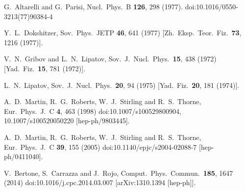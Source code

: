 \documentclass[review]{elsarticle}
\begin{document}
\begin{thebibliography}{}
  G.~Altarelli and G.~Parisi,
  Nucl.\ Phys.\ B {\bf 126}, 298 (1977).
  doi:10.1016/0550-3213(77)90384-4
  
    Y.~L.~Dokshitzer,
    Sov.\ Phys.\ JETP {\bf 46}, 641 (1977)
    [Zh.\ Eksp.\ Teor.\ Fiz.\  {\bf 73}, 1216 (1977)].
    
  V.~N.~Gribov and L.~N.~Lipatov,
  Sov.\ J.\ Nucl.\ Phys.\  {\bf 15}, 438 (1972)
  [Yad.\ Fiz.\  {\bf 15}, 781 (1972)].
  
  L.~N.~Lipatov,
  Sov.\ J.\ Nucl.\ Phys.\  {\bf 20}, 94 (1975)
  [Yad.\ Fiz.\  {\bf 20}, 181 (1974)].
  
  A.~D.~Martin, R.~G.~Roberts, W.~J.~Stirling and R.~S.~Thorne,
  Eur.\ Phys.\ J.\ C {\bf 4}, 463 (1998)
  doi:10.1007/s100529800904, 10.1007/s100520050220
  [hep-ph/9803445].
  
  A.~D.~Martin, R.~G.~Roberts, W.~J.~Stirling and R.~S.~Thorne,
  Eur.\ Phys.\ J.\ C {\bf 39}, 155 (2005)
  doi:10.1140/epjc/s2004-02088-7
  [hep-ph/0411040].
  
  V.~Bertone, S.~Carrazza and J.~Rojo,
  Comput.\ Phys.\ Commun.\  {\bf 185}, 1647 (2014)
  doi:10.1016/j.cpc.2014.03.007
  [arXiv:1310.1394 [hep-ph]].
  

\end{thebibliography}
\end{document}
